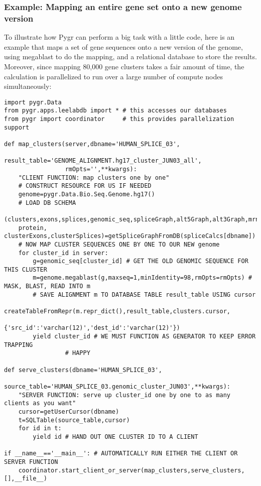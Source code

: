 \documentclass{howto}
\begin{document}
\subsubsection{Example: Mapping an entire gene set onto a new genome version}
To illustrate how Pygr can perform a big task with a little code, here is an example that maps a set of gene sequences onto a new version of the genome, using megablast to do the mapping, and a relational database to store the results.  Moreover, since mapping 80,000 gene clusters takes a fair amount of time, the calculation is parallelized to run over a large number of compute nodes simultaneously:

\begin{verbatim}
import pygr.Data
from pygr.apps.leelabdb import * # this accesses our databases
from pygr import coordinator     # this provides parallelization support

def map_clusters(server,dbname='HUMAN_SPLICE_03',
                 result_table='GENOME_ALIGNMENT.hg17_cluster_JUN03_all',
                 rmOpts='',**kwargs):
    "CLIENT FUNCTION: map clusters one by one"
    # CONSTRUCT RESOURCE FOR US IF NEEDED
    genome=pygr.Data.Bio.Seq.Genome.hg17()
    # LOAD DB SCHEMA
    (clusters,exons,splices,genomic_seq,spliceGraph,alt5Graph,alt3Graph,mrna, 
    protein, clusterExons,clusterSplices)=getSpliceGraphFromDB(spliceCalcs[dbname])
    # NOW MAP CLUSTER SEQUENCES ONE BY ONE TO OUR NEW genome
    for cluster_id in server:
        g=genomic_seq[cluster_id] # GET THE OLD GENOMIC SEQUENCE FOR THIS CLUSTER
        m=genome.megablast(g,maxseq=1,minIdentity=98,rmOpts=rmOpts) # MASK, BLAST, READ INTO m
        # SAVE ALIGNMENT m TO DATABASE TABLE result_table USING cursor
        createTableFromRepr(m.repr_dict(),result_table,clusters.cursor,
                            {'src_id':'varchar(12)','dest_id':'varchar(12)'})
        yield cluster_id # WE MUST FUNCTION AS GENERATOR TO KEEP ERROR TRAPPING 
		         # HAPPY

def serve_clusters(dbname='HUMAN_SPLICE_03',
                   source_table='HUMAN_SPLICE_03.genomic_cluster_JUN03',**kwargs):
    "SERVER FUNCTION: serve up cluster_id one by one to as many clients as you want"
    cursor=getUserCursor(dbname)
    t=SQLTable(source_table,cursor)
    for id in t:
        yield id # HAND OUT ONE CLUSTER ID TO A CLIENT

if __name__=='__main__': # AUTOMATICALLY RUN EITHER THE CLIENT OR SERVER FUNCTION
    coordinator.start_client_or_server(map_clusters,serve_clusters,[],__file__)
\end{verbatim}
\end{document}
